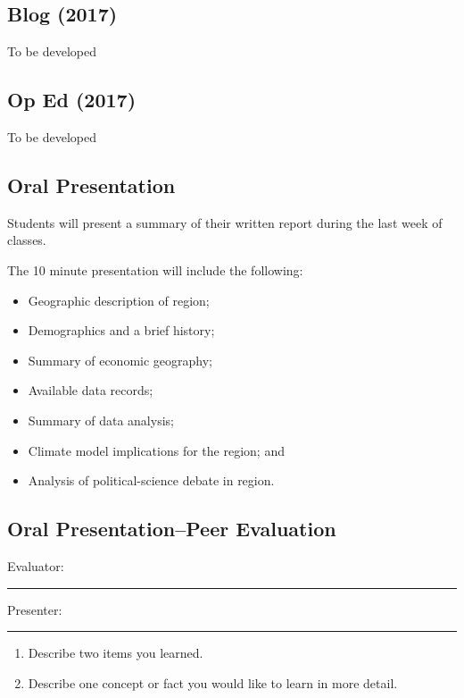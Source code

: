 \documentclass{article}\usepackage[]{graphicx}\usepackage[]{color}
\begin{document}
\subsection{Blog (2017)}

To be developed

\subsection{Op Ed (2017)}

To be developed

\subsection{Oral Presentation}

Students will present a summary of their written report during the last week of classes. 

The 10 minute presentation will include the following:

\begin{itemize}
  \item Geographic description of region;
  \item Demographics and a brief history;
  \item Summary of economic geography;
  \item Available data records;
  \item Summary of data analysis;
  \item Climate model implications for the region; and
  \item Analysis of political-science debate in region.
  
\end{itemize}


\newpage
\subsection{Oral Presentation--Peer Evaluation}

\bigskip
Evaluator: \rule{7cm}{0.4pt}

\bigskip

\noindent Presenter: \rule{7cm}{0.4pt}

\begin{enumerate}
 \setlength\itemsep{4em}
  \item Describe two items you learned.
  \item Describe one concept or fact you would like to learn in more detail.
\end{enumerate}
\end{document}

